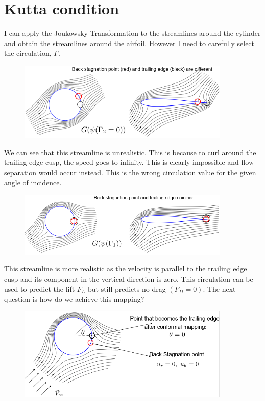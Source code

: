 \documentclass[class=report, crop=false, 12pt,a4paper]{standalone}
\begin{document}
\section{Kutta condition}
I can apply the Joukowsky Transformation to the streamlines around the cylinder and obtain the streamlines around the airfoil. However I need to carefully select the circulation, $\Gamma$.
\begin{figure}[H]
  \centering
  \includegraphics[width = 0.9\textwidth]{../img/diagram38.png}
\end{figure}
We can see that this streamline is unrealistic. This is because to curl around the trailing edge cusp, the speed goes to infinity. This is clearly impossible and flow separation would occur instead. This is the wrong circulation value for the given angle of incidence.
\begin{figure}[H]
  \centering
  \includegraphics[width = 0.9\textwidth]{../img/diagram39.png}
\end{figure}
This streamline is more realistic as the velocity is parallel to the trailing edge cusp and its component in the vertical direction is zero. This circulation can be used to predict the lift $F_L$ but still predicts no drag $(F_D = 0)$. The next question is how do we achieve this mapping?
\begin{figure}[H]
  \centering
  \includegraphics[width = 0.9\textwidth]{../img/diagram40.png}
\end{figure}
\end{document}
